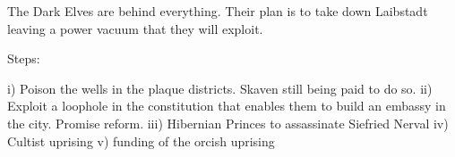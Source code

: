 


The Dark Elves are behind everything.  Their plan is to take down Laibstadt leaving a power vacuum that they will exploit.

Steps:

   i) Poison the wells in the plaque districts.  Skaven still being paid to do so.
   ii) Exploit a loophole in the constitution that enables them to build an embassy in the city.  Promise reform.
   iii) Hibernian Princes to assassinate Siefried Nerval
   iv) Cultist uprising
   v) funding of the orcish uprising
 
